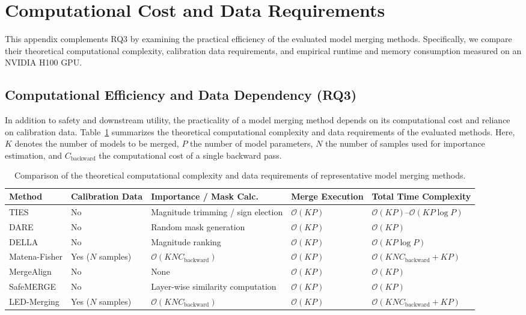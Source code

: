 \documentclass{article}
\begin{document}
\section{Computational Cost and Data Requirements}
\label{app:計算資源とデータ要件}

This appendix complements RQ3 by examining the practical efficiency of the evaluated model merging methods. Specifically, we compare their theoretical computational complexity, calibration data requirements, and empirical runtime and memory consumption measured on an NVIDIA H100 GPU.

\subsection{Computational Efficiency and Data Dependency (RQ3)}

In addition to safety and downstream utility, the practicality of a model merging method depends on its computational cost and reliance on calibration data. Table~\ref{tab:cost} summarizes the theoretical computational complexity and data requirements of the evaluated methods. Here, $K$ denotes the number of models to be merged, $P$ the number of model parameters, $N$ the number of samples used for importance estimation, and $C_{\mathrm{backward}}$ the computational cost of a single backward pass.

\begin{table}[htbp]
\caption{Comparison of the theoretical computational complexity and data requirements of representative model merging methods.}
\label{tab:cost}
\centering
\small
\setlength{\tabcolsep}{3pt}
\renewcommand{\arraystretch}{1.10}
\begin{tabularx}{\textwidth}{
>{\raggedright\arraybackslash}p{1.85cm}
>{\centering\arraybackslash}p{1.70cm}
>{\raggedright\arraybackslash}p{3.25cm}
>{\centering\arraybackslash}p{1.75cm}
>{\raggedright\arraybackslash}X
}
\toprule
\textbf{Method} &
\textbf{Calibration Data} &
\textbf{Importance / Mask Calc.} &
\textbf{Merge Execution} &
\textbf{Total Time Complexity} \\
\midrule
TIES
& No
& Magnitude trimming / sign election
& $\mathcal{O}(KP)$
& $\mathcal{O}(KP)$--$\mathcal{O}(KP\log P)$ \\
\midrule
DARE
& No
& Random mask generation
& $\mathcal{O}(KP)$
& $\mathcal{O}(KP)$ \\
\midrule
DELLA
& No
& Magnitude ranking
& $\mathcal{O}(KP)$
& $\mathcal{O}(KP\log P)$ \\
\midrule
Matena-Fisher
& Yes ($N$ samples)
& $\mathcal{O}(KN C_{\text{backward}})$
& $\mathcal{O}(KP)$
& $\mathcal{O}(KN C_{\text{backward}} + KP)$ \\
\midrule
MergeAlign
& No
& None
& $\mathcal{O}(KP)$
& $\mathcal{O}(KP)$ \\
\midrule
SafeMERGE
& No
& Layer-wise similarity computation
& $\mathcal{O}(KP)$
& $\mathcal{O}(KP)$ \\
\midrule
LED-Merging
& Yes ($N$ samples)
& $\mathcal{O}(KN C_{\text{backward}})$
& $\mathcal{O}(KP)$
& $\mathcal{O}(KN C_{\text{backward}} + KP)$ \\
\bottomrule
\end{tabularx}
\end{table}
\end{document}
